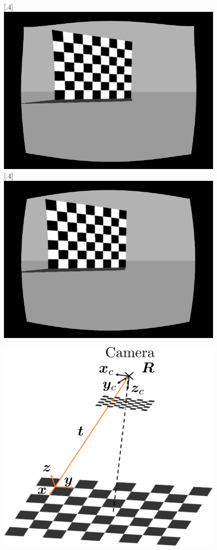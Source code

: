 \begin{figure}[h]
	\centering
	\subcaptionbox{}%
	[.4\linewidth]{\includegraphics[scale=.2]{chapters/03_background/img/gazebo_rectified_left.jpg}}
	\subcaptionbox{}%
	[.4\linewidth]{\includegraphics[scale=.2]{chapters/03_background/img/gazebo_rectified_right.jpg}}
	\caption{}
	\label{fig::323_rectified}
\end{figure}
\begin{figure}[h]
	\centering
	\includegraphics[scale=.28]{chapters/03_background/img/calibration_process.png}
	\caption{}
	\label{fig::323_calibration_process}
\end{figure}